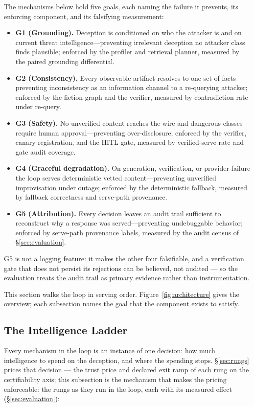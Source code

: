 The mechanisms below hold five goals, each naming the failure it
prevents, its enforcing component, and its falsifying measurement:
\begin{itemize}
\item \textbf{G1 (Grounding).} Deception is conditioned on who the
attacker is and on current threat intelligence---preventing irrelevant
deception no attacker class finds plausible; enforced by the profiler and
retrieval planner, measured by the paired grounding differential.
\item \textbf{G2 (Consistency).} Every observable artifact resolves to one
set of facts---preventing inconsistency as an information channel to a
re-querying attacker; enforced by the fiction graph and the verifier,
measured by contradiction rate under re-query.
\item \textbf{G3 (Safety).} No unverified content reaches the wire and
dangerous classes require human approval---preventing over-disclosure;
enforced by the verifier, canary registration, and the HITL gate,
measured by verified-serve rate and gate audit coverage.
\item \textbf{G4 (Graceful degradation).} On generation, verification, or
provider failure the loop serves deterministic vetted content---preventing
unverified improvisation under outage; enforced by the deterministic
fallback, measured by fallback correctness and serve-path provenance.
\item \textbf{G5 (Attribution).} Every decision leaves an audit trail
sufficient to reconstruct why a response was served---preventing
undebuggable behavior; enforced by serve-path provenance labels, measured
by the audit census of \S\ref{sec:evaluation}.
\end{itemize}
G5 is not a logging feature: it makes the other four falsifiable, and a
verification gate that does not persist its rejections can be believed,
not audited --- so the evaluation treats the audit trail as primary
evidence rather than instrumentation.

This section walks the loop in serving
order. Figure~\ref{fig:architecture} gives the overview; each subsection
names the goal that the component exists to satisfy.

\subsection{The Intelligence Ladder}
\label{sec:ladder}
Every mechanism in the loop is an instance of one decision: how much
intelligence to spend on the deception, and where the spending stops.
\S\ref{sec:rungs} prices that decision --- the trust price and declared
exit ramp of each rung on the certifiability axis; this subsection is
the mechanism that makes the pricing enforceable: the rungs as they
run in the loop, each with its measured effect
(\S\ref{sec:evaluation}):


